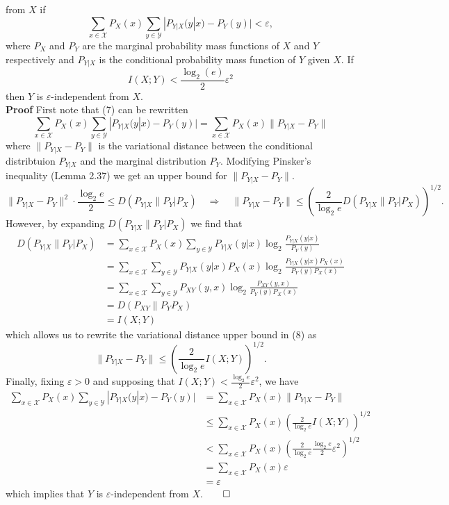 \documentclass[11pt, letterpaper]{article}
\newcommand{\mc}[1]{\mathcal{#1}}
\begin{document}
from $X$ if
\[\sum_{x\in\mc{X}}P_X(x)\sum_{y\in\mc{Y}}|P_{Y|X}(y|x)-P_Y(y)|<\varepsilon,\tag{7}\]
where $P_X$ and $P_Y$ are the marginal probability mass functions of $X$ and $Y$ respectively and $P_{Y|X}$ is the conditional probability mass function
of $Y$ given $X$. If
\[I(X;Y)<\frac{\log_2(e)}{2}\varepsilon^2\]
then $Y$ is $\varepsilon$-independent from $X$.\\[10pt]
{\bf Proof} First note that (7) can be rewritten
\[\sum_{x\in\mc{X}}P_X(x)\sum_{y\in\mc{Y}}|P_{Y|X}(y|x)-P_Y(y)|=\sum_{x\in\mc{X}}P_X(x)\|P_{Y|X}-P_Y\|\]
where $\|P_{Y|X}-P_Y\|$ is the variational distance between the conditional distribtuion $P_{Y|X}$ and the marginal distribution $P_Y$. Modifying Pinsker's inequality (Lemma 2.37)
we get an upper bound for $\|P_{Y|X}-P_Y\|$.
\[\|P_{Y|X}-P_Y\|^2\cdot\frac{\log_2e}{2}\leq D(P_{Y|X}\|P_Y|P_X)\quad\Rightarrow\quad\|P_{Y|X}-P_Y\|\leq\left(\frac{2}{\log_2e}D(P_{Y|X}\|P_Y|P_X)\right)^{1/2}.\tag{8}\]
However, by expanding $D(P_{Y|X}\|P_Y|P_X)$ we find that
\begin{align*}
    D(P_{Y|X}\|P_Y|P_X)&=\sum_{x\in\mc{X}}P_X(x)\sum_{y\in\mc{Y}}P_{Y|X}(y|x)\log_2\frac{P_{Y|X}(y|x)}{P_Y(y)}\\
    &=\sum_{x\in\mc{X}}\sum_{y\in\mc{Y}}P_{Y|X}(y|x)P_X(x)\log_2\frac{P_{Y|X}(y|x)P_X(x)}{P_Y(y)P_X(x)}\\
    &=\sum_{x\in\mc{X}}\sum_{y\in\mc{Y}}P_{XY}(y,x)\log_2\frac{P_{XY}(y,x)}{P_Y(y)P_X(x)}\\
    &=D(P_{XY}\|P_YP_X)\\
    &=I(X;Y)
\end{align*}
which allows us to rewrite the variational distance upper bound in (8) as
\[\|P_{Y|X}-P_Y\|\leq\left(\frac{2}{\log_2e}I(X;Y)\right)^{1/2}.\]
Finally, fixing $\varepsilon>0$ and supposing that $I(X;Y)<\frac{\log_2e}{2}\varepsilon^2$, we have
\begin{align*}
    \sum_{x\in\mc{X}}P_X(x)\sum_{y\in\mc{Y}}|P_{Y|X}(y|x)-P_Y(y)|&=\sum_{x\in\mc{X}}P_X(x)\|P_{Y|X}-P_Y\|\\
    &\leq\sum_{x\in\mc{X}}P_X(x)\left(\frac{2}{\log_2e}I(X;Y)\right)^{1/2}\\
    &<\sum_{x\in\mc{X}}P_X(x)\left(\frac{2}{\log_2e}\frac{\log_2e}{2}\varepsilon^2\right)^{1/2}\\
    &=\sum_{x\in\mc{X}}P_X(x)\varepsilon\\
    &=\varepsilon
\end{align*}
which implies that $Y$ is $\varepsilon$-independent from $X$.\hfill{$\qed$}
\end{document}
